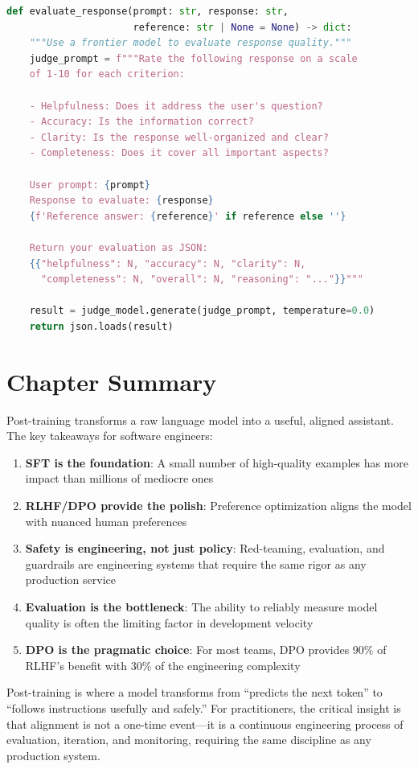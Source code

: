 \begin{lstlisting}[language=Python, caption={LLM-as-Judge evaluation}]
def evaluate_response(prompt: str, response: str, 
                      reference: str | None = None) -> dict:
    """Use a frontier model to evaluate response quality."""
    judge_prompt = f"""Rate the following response on a scale 
    of 1-10 for each criterion:
    
    - Helpfulness: Does it address the user's question?
    - Accuracy: Is the information correct?
    - Clarity: Is the response well-organized and clear?
    - Completeness: Does it cover all important aspects?
    
    User prompt: {prompt}
    Response to evaluate: {response}
    {f'Reference answer: {reference}' if reference else ''}
    
    Return your evaluation as JSON:
    {{"helpfulness": N, "accuracy": N, "clarity": N, 
      "completeness": N, "overall": N, "reasoning": "..."}}"""
    
    result = judge_model.generate(judge_prompt, temperature=0.0)
    return json.loads(result)
\end{lstlisting}

\section{Chapter Summary}

Post-training transforms a raw language model into a useful, aligned assistant. The key takeaways for software engineers:

\begin{enumerate}[leftmargin=*]
    \item \textbf{SFT is the foundation}: A small number of high-quality examples has more impact than millions of mediocre ones
    \item \textbf{RLHF/DPO provide the polish}: Preference optimization aligns the model with nuanced human preferences
    \item \textbf{Safety is engineering, not just policy}: Red-teaming, evaluation, and guardrails are engineering systems that require the same rigor as any production service
    \item \textbf{Evaluation is the bottleneck}: The ability to reliably measure model quality is often the limiting factor in development velocity
    \item \textbf{DPO is the pragmatic choice}: For most teams, DPO provides 90\% of RLHF's benefit with 30\% of the engineering complexity
\end{enumerate}

\begin{keytakeaway}
Post-training is where a model transforms from ``predicts the next token'' to ``follows instructions usefully and safely.'' For practitioners, the critical insight is that alignment is not a one-time event---it is a continuous engineering process of evaluation, iteration, and monitoring, requiring the same discipline as any production system.
\end{keytakeaway}
